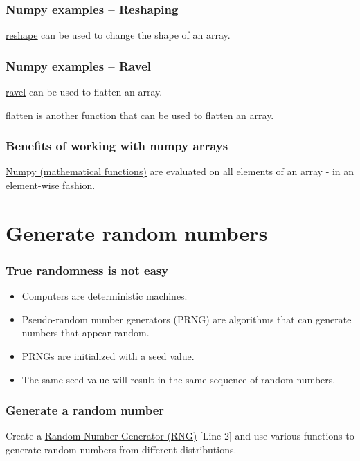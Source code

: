 \documentclass{beamer}
\newcommand{\hrefu}[2]{\underline{\href{#1}{#2}}}
\begin{document}
\begin{frame}
  \frametitle{Numpy examples -- Reshaping}
  \hrefu{https://numpy.org/doc/stable/reference/generated/numpy.reshape.html}{reshape} can be used to change the shape of an array.
  
\end{frame}
\begin{frame}
  \frametitle{Numpy examples -- Ravel}
  \hrefu{https://numpy.org/doc/stable/reference/generated/numpy.ravel.html}{ravel} can be used to flatten an array.
  
  \hrefu{https://numpy.org/doc/stable/reference/generated/numpy.ndarray.flatten.html}{flatten} is another function that can be used to flatten an array.
\end{frame}
\begin{frame}
  \frametitle{Benefits of working with numpy arrays}
  \hrefu{https://numpy.org/doc/stable/reference/routines.math.html}{Numpy (mathematical functions)} are evaluated on all elements of an array - in an element-wise fashion.
  
\end{frame}

\section{Generate random numbers}
\begin{frame}
    \frametitle{True randomness is not easy}
    \begin{itemize}
        \item Computers are deterministic machines.
        \item Pseudo-random number generators (PRNG) are algorithms that can generate numbers that appear random.
        \item PRNGs are initialized with a seed value.
        \item The same seed value will result in the same sequence of random numbers.
    \end{itemize}
\end{frame}
\begin{frame}
  \frametitle{Generate a random number}
    Create a \hrefu{https://numpy.org/doc/stable/reference/random/index.html}{Random Number Generator (RNG)} [Line 2] and use various functions to generate random numbers from different distributions.\\
    
    
\end{frame}
\end{document}
